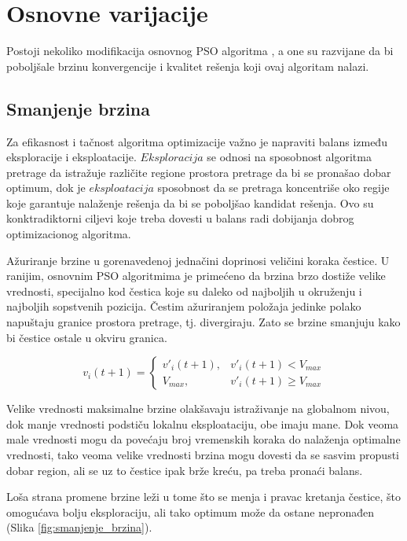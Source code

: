 \documentclass[a4paper]{article}
\begin{document}
    
\section{Osnovne varijacije}
Postoji nekoliko modifikacija osnovnog PSO algoritma \cite{rini2011particle}, a one su razvijane da bi poboljšale brzinu konvergencije i kvalitet rešenja koji ovaj algoritam nalazi.

\subsection{Smanjenje brzina}
Za efikasnost i tačnost algoritma optimizacije važno je napraviti balans između eksploracije i eksploatacije. 
$Eksploracija$ se odnosi na sposobnost algoritma pretrage da istražuje različite regione prostora pretrage da bi se pronašao dobar optimum, dok je $eksploatacija$ sposobnost  da se pretraga koncentriše oko regije koje garantuje nalaženje rešenja da bi se poboljšao kandidat rešenja. Ovo su konktradiktorni ciljevi koje treba dovesti u balans radi dobijanja dobrog optimizacionog algoritma.

Ažuriranje brzine u gorenavedenoj jednačini doprinosi veličini koraka čestice. U ranijim, osnovnim PSO algoritmima je primećeno da brzina brzo dostiže velike vrednosti, specijalno kod čestica koje su daleko od najboljih u okruženju i najboljih sopstvenih pozicija. Čestim ažuriranjem položaja jedinke polako napuštaju granice prostora pretrage, tj. divergiraju. Zato se brzine smanjuju kako bi čestice ostale u okviru granica.

\begin{equation}
    v_i(t+1) = \begin{cases}
                
            v'_i(t+1),  &  v'_i(t+1) < V_{max}\\
            V_{max},  &   v'_i(t+1) \geq V_{max}
           
             \end{cases}
\end{equation}

Velike vrednosti maksimalne brzine olakšavaju istraživanje na globalnom nivou, dok manje vrednosti podstiču lokalnu eksploataciju, obe imaju mane. Dok veoma male vrednosti mogu da povećaju broj vremenskih koraka do nalaženja optimalne vrednosti, tako veoma velike vrednosti brzina mogu dovesti da se sasvim propusti dobar region, ali se uz to čestice ipak brže kreću, pa treba pronaći balans.

Loša strana promene brzine leži u tome što se menja i pravac kretanja čestice, što omogućava bolju eksploraciju, ali tako optimum može da ostane nepronađen (Slika \ref{fig:smanjenje_brzina}).
\end{document}

